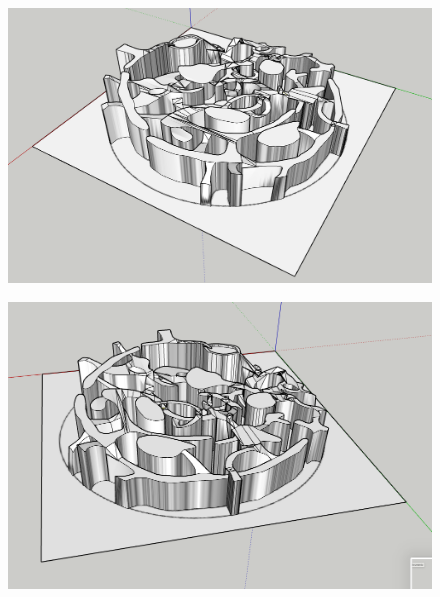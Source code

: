 \begin{figure}[H]
	\centering
	\includegraphics[width=14cm]{images/map/3D_map_005.png}
\end{figure}
\vspace*{3cm}
\begin{figure}[H]
	\centering
	\includegraphics[width=14cm]{images/map/3D_map_006.png}
\end{figure}

